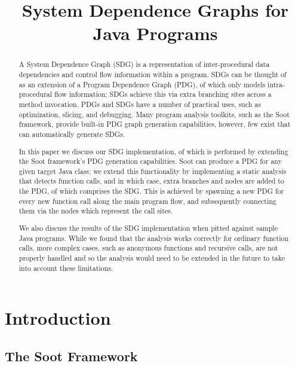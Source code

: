 \documentclass[authoryear,preprint]{sigplanconf}
\begin{document}
\setlength{\pdfpageheight}{\paperheight}
\setlength{\pdfpagewidth}{\paperwidth}


\title{System Dependence Graphs for Java Programs}



\maketitle

\begin{abstract}
A System Dependence Graph (SDG) is a representation of inter-procedural data dependencies and control flow information within a program. SDGs can be thought of as an extension of a Program Dependence Graph (PDG), of which only models intra-procedural flow information; SDGs achieve this via extra branching sites across a method invocation. PDGs and SDGs have a number of practical uses, such as optimization, slicing, and debugging. Many program analysis toolkits, such as the Soot framework, provide built-in PDG graph generation capabilities, however, few exist that can automatically generate SDGs.    

In this paper we discuss our SDG implementation, of which is performed by extending the Soot framework's PDG generation capabilities. Soot can produce a PDG for any given target Java class; we extend this functionality by implementing a static analysis that detects function calls, and in which case, extra branches and nodes are added to the PDG, of which comprises the SDG. This is achieved by spawning a new PDG for every new function call along the main program flow, and subsequently connecting them via the nodes which represent the call sites.

We also discuss the results of the SDG implementation when pitted against sample Java programs. While we found that the analysis works correctly for ordinary function calls, more complex cases, such as anonymous functions and recursive calls, are not properly handled and so the analysis would need to be extended in the future to take into account these limitations.  
\end{abstract}

\section{Introduction}
\subsection{The Soot Framework}
\end{document}
